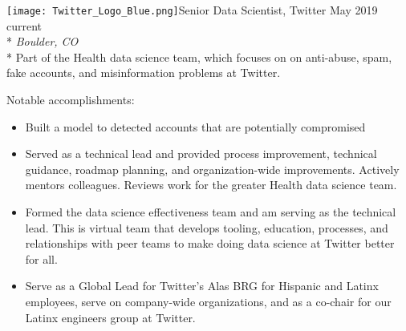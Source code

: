 \documentclass[print]{friggeri-cv} %
\newcommand{\twittericon}{\texttt{[image: Twitter\_Logo\_Blue.png]}}%
\begin{document}
\begin{description} \itemsep1pt \parskip0pt 
  \item \twittericon {\largeheaderfont Senior Data Scientist, Twitter } \hfill
    {\smallheaderfont May 2019 \textemdash  current}\\*
    {\footnotesize \emph{Boulder, CO}} \\*
    Part of the Health data science team, which focuses on on anti-abuse,
    spam, fake accounts, and misinformation problems at Twitter.

    {\smallheaderfont Notable accomplishments}:
    \begin{itemize} \itemsep1pt \parskip1pt 

    \item Built a model to detected accounts that are potentially compromised
    \item Served as a technical lead and provided process improvement,
      technical guidance, roadmap planning, and organization-wide improvements.
      Actively mentors colleagues. Reviews work for the greater Health data science
      team.
    \item Formed the data science effectiveness team and am serving as the
      technical lead. This is virtual team that develops tooling, education,
      processes, and relationships with peer teams to make doing data science
      at Twitter better for all.
    \item Serve as a Global Lead for Twitter's Alas BRG for Hispanic and Latinx
      employees, serve on company-wide organizations, and as a co-chair for our
      Latinx engineers group at Twitter.

  \end{itemize}

  \end{description}
\end{document}
